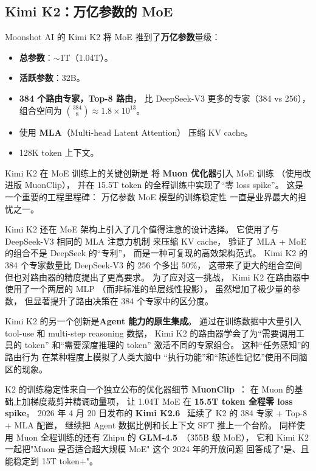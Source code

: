\subsection{Kimi K2：万亿参数的 MoE}

Moonshot AI 的 Kimi K2 将 MoE 推到了\textbf{万亿参数}量级：%
\begin{itemize}[noitemsep]
  \item \textbf{总参数}：$\sim$1T（1.04T）。
  \item \textbf{活跃参数}：32B。
  \item \textbf{384 个路由专家，Top-8 路由}，
        比 DeepSeek-V3 更多的专家（384 vs 256），
        组合空间为 $\binom{384}{8} \approx 1.8 \times 10^{13}$。
  \item 使用 \textbf{MLA}（Multi-head Latent Attention）
        压缩 KV cache。
  \item 128K token 上下文。
\end{itemize}

Kimi K2 在 MoE 训练上的关键创新是
将 \textbf{Muon 优化器}引入 MoE 训练
（使用改进版 MuonClip），
并在 15.5T token 的全程训练中实现了“零 loss spike”。
这是一个重要的工程里程碑：
万亿参数 MoE 模型的训练稳定性
一直是业界最大的担忧之一。

Kimi K2 还在 MoE 架构上引入了几个值得注意的设计选择。
它使用了与 DeepSeek-V3 相同的 MLA 注意力机制
来压缩 KV cache，
验证了 MLA + MoE 的组合不是 DeepSeek 的“专利”，
而是一种可复现的高效架构范式。
Kimi K2 的 384 个专家数量比 DeepSeek-V3 的 256 个多出 50\%，
这带来了更大的组合空间
但也对路由器的精度提出了更高要求。
为了应对这一挑战，
Kimi K2 在路由器中使用了一个两层的 MLP
（而非标准的单层线性投影），
虽然增加了极少量的参数，
但显著提升了路由决策在 384 个专家中的区分度。

Kimi K2 的另一个创新是\textbf{Agent 能力的原生集成}。
通过在训练数据中大量引入 tool-use 和 multi-step reasoning 数据，
Kimi K2 的路由器学会了为“需要调用工具的 token”
和“需要深度推理的 token”
激活不同的专家组合。
这种“任务感知”的路由行为
在某种程度上模拟了人类大脑中
“执行功能”和“陈述性记忆”使用不同脑区的现象。

K2 的训练稳定性来自一个独立公布的优化器细节
\textbf{MuonClip}~\cite{muonClipKimiK22025}：
在 Muon 的基础上加梯度裁剪并精调动量项，
让 1.04T MoE 在 \textbf{15.5T token 全程零 loss spike}。
2026 年 4 月 20 日发布的 \textbf{Kimi K2.6}~\cite{kimik262026}
延续了 K2 的 384 专家 + Top-8 + MLA 配置，
继续把 Agent 数据比例和长上下文 SFT 推上一个台阶。
同样使用 Muon 全程训练的还有 Zhipu 的
\textbf{GLM-4.5}~\cite{glm452025}（355B 级 MoE），
它和 Kimi K2 一起把"Muon 是否适合超大规模 MoE"
这个 2024 年的开放问题
回答成了"是、且能稳定到 15T token+"。

